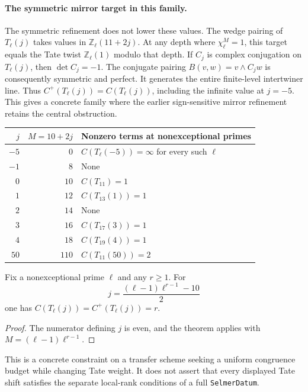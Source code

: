 \paragraph{The symmetric mirror target in this family.}
The symmetric refinement does not lower these values.  The wedge
pairing of $T_\ell(j)$ takes values in $\mathbb Z_\ell(11+2j)$.
At any depth where $\chi_\ell^M=1$, this target equals the Tate twist
$\mathbb Z_\ell(1)$ modulo that depth.  If $C_j$ is complex
conjugation on $T_\ell(j)$, then $\det C_j=-1$.
The conjugate pairing $B(v,w)=v\wedge C_jw$ is consequently symmetric
and perfect.  It generates the entire finite-level intertwiner line.
Thus $C^+(T_\ell(j))=C(T_\ell(j))$, including the infinite value at
$j=-5$.  This gives a concrete family where the earlier
sign-sensitive mirror refinement retains the central obstruction.

\begin{center}
\begin{tabular}{r r l}
\hline
$j$ & $M=10+2j$ & Nonzero terms at nonexceptional primes \\
\hline
$-5$ & $0$ & $C(T_\ell(-5))=\infty$ for every such $\ell$ \\
$-1$ & $8$ & None \\
$0$ & $10$ & $C(T_{11})=1$ \\
$1$ & $12$ & $C(T_{13}(1))=1$ \\
$2$ & $14$ & None \\
$3$ & $16$ & $C(T_{17}(3))=1$ \\
$4$ & $18$ & $C(T_{19}(4))=1$ \\
$50$ & $110$ & $C(T_{11}(50))=2$ \\
\hline
\end{tabular}
\end{center}

\begin{corollary}
Fix a nonexceptional prime $\ell$ and any $r\geq1$.  For
\[
 j=\frac{(\ell-1)\ell^{r-1}-10}{2}
\]
one has $C(T_\ell(j))=C^+(T_\ell(j))=r$.
\end{corollary}
\begin{proof}
The numerator defining $j$ is even, and the theorem applies with
$M=(\ell-1)\ell^{r-1}$.
\end{proof}
This is a concrete constraint on a transfer scheme seeking a uniform
congruence budget while changing Tate weight.  It does not assert that
every displayed Tate shift satisfies the separate local-rank conditions
of a full \texttt{SelmerDatum}.

